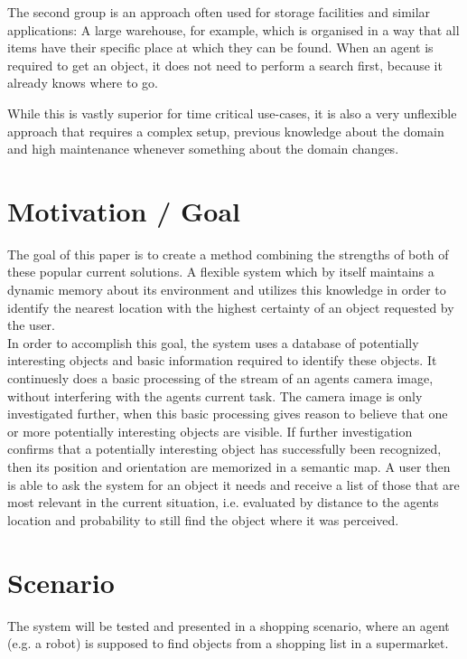 \documentclass[11pt, twoside, a4paper]{report}
\begin{document}
The second group is an approach often used for storage facilities and similar applications: A large warehouse, for example, which is organised in a way that all items have their specific place at which they can be found. When an agent is required to get an object, it does not need to perform a search first, because it already knows where to go.

While this is vastly superior for time critical use-cases, it is also a very unflexible approach that requires a complex setup, previous knowledge about the domain and high maintenance whenever something about the domain changes.

\section{Motivation / Goal} %
The goal of this paper is to create a method combining the strengths of both of these popular current solutions. A flexible system which by itself maintains a dynamic memory about its environment and utilizes this knowledge in order to identify the nearest location with the highest certainty of an object requested by the user. \\

In order to accomplish this goal, the system uses a database of potentially interesting objects and basic information required to identify these objects. It continuesly does a basic processing of the stream of an agents camera image, without interfering with the agents current task. The camera image is only investigated further, when this basic processing gives reason to believe that one or more potentially interesting objects are visible. If further investigation confirms that a potentially interesting object has successfully been recognized, then its position and orientation are memorized in a semantic map. A user then is able to ask the system for an object it needs and receive a list of those that are most relevant in the current situation, i.e. evaluated by distance to the agents location and probability to still find the object where it was perceived.

\section{Scenario}
The system will be tested and presented in a shopping scenario, where an agent (e.g. a robot) is supposed to find objects from a shopping list in a supermarket. \\
\end{document}
